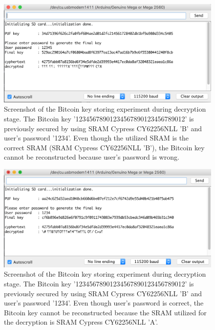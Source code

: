 \begin{figure}[tph!]
    \centerline{\includegraphics[width={\textwidth}]{images/B_decrypt_wrong_password}}
    \caption{Screenshot of the Bitcoin key storing experiment during decryption stage. The Bitcoin key '12345678901234567890123456789012' is previously secured by using SRAM Cypress CY62256NLL 'B' and user's password '1234'.
    Even though the utilized SRAM is the correct SRAM (SRAM Cypress CY62256NLL 'B'), the Bitcoin key cannot be reconstructed because user's password is wrong.}
    \label{fig:B_decrypt_wrong_password}
\end{figure}

\begin{figure}[tph!]
    \centerline{\includegraphics[width={\textwidth}]{images/B_decrypt_wrong_SRAM}}
    \caption{Screenshot of the Bitcoin key storing experiment during decryption stage. The Bitcoin key '12345678901234567890123456789012' is previously secured by using SRAM Cypress CY62256NLL 'B' and user's password '1234'.
    Even though user's password is correct, the Bitcoin key cannot be reconstructed because the SRAM utilized for the decryption is SRAM Cypress CY62256NLL 'A'.}
    \label{fig:B_decrypt_wrong_SRAM}
\end{figure}

